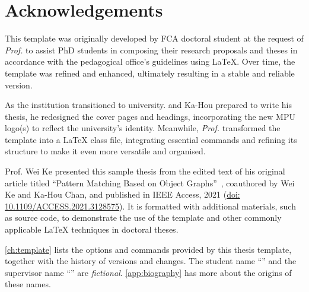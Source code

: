 \chapter{Acknowledgements}\label{ch:ack}

\begin{BlindRegion}

This template was originally developed by \gls{FCA} doctoral student 
at the request of \textit{Prof.} 
to assist \gls{PhD} students in composing their research proposals and theses in accordance with the pedagogical office’s guidelines using {\LaTeX}.
Over time, the template was refined and enhanced, ultimately resulting in a stable and reliable version.

As the institution transitioned to university. and Ka-Hou prepared to write his thesis, he redesigned the cover pages and headings, incorporating the new \gls{MPU} logo(s) to reflect the university’s identity.
Meanwhile, \textit{Prof.}  transformed the template into a {\LaTeX} class file, integrating essential commands and refining its structure to make it even more versatile and organised.

Prof. Wei Ke presented this sample thesis from the edited text of his original article titled ``Pattern Matching Based on Object Graphs''~\cite{ke2021pattern},
coauthored by Wei Ke and Ka-Hou Chan, and
published in IEEE Access, 2021 (\href{https://doi.org/10.1109/ACCESS.2021.3128575}{\sc doi: \sf\small 10.1109/ACCESS.2021.3128575}).
It is formatted with additional materials, such as source code, to demonstrate the use of the template and other commonly applicable {\LaTeX} techniques in doctoral theses.

\autoref{ch:template} lists the options and commands provided by this thesis template,
together with the history of versions and changes.
The student name ``\InsertStudentName'' and the supervisor name ``\InsertSupervisor'' are {\em fictional}. \autoref{app:biography} has more about the origins of these names.

\end{BlindRegion}
